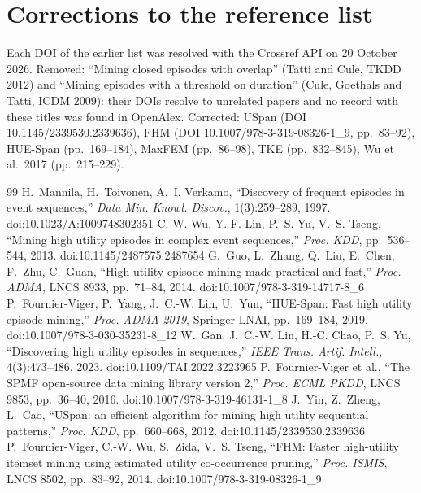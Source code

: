 \documentclass[11pt]{article}
\newcommand{\HUESpan}{\textsf{HUE-Span}}
\begin{document}
\section{Corrections to the reference list}\label{sec:corrections}

Each DOI of the earlier list was resolved with the Crossref API on 20 October 2026. Removed: ``Mining closed episodes with overlap'' (Tatti and Cule, TKDD 2012) and ``Mining episodes with a threshold on duration'' (Cule, Goethals and Tatti, ICDM 2009): their DOIs resolve to unrelated papers and no record with these titles was found in OpenAlex. Corrected: USpan (DOI 10.1145/2339530.2339636), FHM (DOI 10.1007/978-3-319-08326-1\_9, pp.~83--92), \HUESpan{} (pp.~169--184), MaxFEM (pp.~86--98), TKE (pp.~832--845), Wu et al.\ 2017 (pp.~215--229).

\begin{thebibliography}{99}
 H.~Mannila, H.~Toivonen, A.~I. Verkamo, ``Discovery of frequent episodes in event sequences,'' \emph{Data Min. Knowl. Discov.}, 1(3):259--289, 1997. doi:10.1023/A:1009748302351
 C.-W. Wu, Y.-F. Lin, P.~S. Yu, V.~S. Tseng, ``Mining high utility episodes in complex event sequences,'' \emph{Proc. KDD}, pp.~536--544, 2013. doi:10.1145/2487575.2487654
 G.~Guo, L.~Zhang, Q.~Liu, E.~Chen, F.~Zhu, C.~Guan, ``High utility episode mining made practical and fast,'' \emph{Proc. ADMA}, LNCS 8933, pp.~71--84, 2014. doi:10.1007/978-3-319-14717-8\_6
 P.~Fournier-Viger, P.~Yang, J.~C.-W. Lin, U.~Yun, ``HUE-Span: Fast high utility episode mining,'' \emph{Proc. ADMA 2019}, Springer LNAI, pp.~169--184, 2019. doi:10.1007/978-3-030-35231-8\_12
 W.~Gan, J.~C.-W. Lin, H.-C. Chao, P.~S. Yu, ``Discovering high utility episodes in sequences,'' \emph{IEEE Trans. Artif. Intell.}, 4(3):473--486, 2023. doi:10.1109/TAI.2022.3223965
 P.~Fournier-Viger et al., ``The SPMF open-source data mining library version 2,'' \emph{Proc. ECML PKDD}, LNCS 9853, pp.~36--40, 2016. doi:10.1007/978-3-319-46131-1\_8
 J.~Yin, Z.~Zheng, L.~Cao, ``USpan: an efficient algorithm for mining high utility sequential patterns,'' \emph{Proc. KDD}, pp.~660--668, 2012. doi:10.1145/2339530.2339636
 P.~Fournier-Viger, C.-W. Wu, S.~Zida, V.~S. Tseng, ``FHM: Faster high-utility itemset mining using estimated utility co-occurrence pruning,'' \emph{Proc. ISMIS}, LNCS 8502, pp.~83--92, 2014. doi:10.1007/978-3-319-08326-1\_9
\end{thebibliography}
\end{document}
